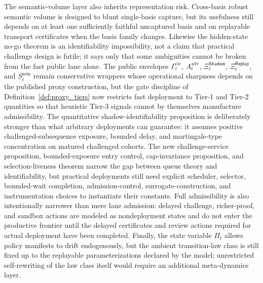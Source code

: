 \documentclass[11pt]{article}
\theoremstyle{definition}
\newcommand{\1}{\mathbf{1}}
\newcommand{\Shadow}{\mathsf{Shadow}}
\newcommand{\Replay}{\mathsf{Replay}}
\begin{document}
The semantic-volume layer also inherits representation risk. Cross-basis robust semantic volume is designed to blunt single-basis capture, but its usefulness still depends on at least one sufficiently faithful uncaptured basis and on replayable transport certificates when the basis family changes. Likewise the hidden-state no-go theorem is an identifiability impossibility, not a claim that practical challenge design is futile; it says only that some ambiguities cannot be broken from the fast public lane alone. The public envelopes $\Gamma_t^{\mathrm{cic}}$, $A_t^{\mathrm{adv}}$, $\Xi_t^{\Shadow}$, $\Xi_t^{\Replay}$, and $\underline S_t^{\mathrm{sem}}$ remain conservative wrappers whose operational sharpness depends on the published proxy construction, but the gate discipline of Definition~\ref{def:proxy_tiers} now restricts fast deployment to Tier-1 and Tier-2 quantities so that heuristic Tier-3 signals cannot by themselves manufacture admissibility. The quantitative shadow-identifiability proposition is deliberately stronger than what arbitrary deployments can guarantee: it assumes positive challenged-subsequence exposure, bounded delay, and martingale-type concentration on matured challenged cohorts. The new challenge-service proposition, bounded-exposure entry control, cap-invariance proposition, and selection-liveness theorem narrow the gap between queue theory and identifiability, but practical deployments still need explicit scheduler, selector, bounded-wait completion, admission-control, surrogate-construction, and instrumentation choices to instantiate their constants. Full admissibility is also intentionally narrower than mere lane admission: delayed challenge, richer-proof, and sandbox actions are modeled as nondeployment states and do not enter the productive frontier until the delayed certificates and review actions required for actual deployment have been completed. Finally, the state variable $\Pi_t$ allows policy manifests to drift endogenously, but the ambient transition-law class is still fixed up to the replayable parameterizations declared by the model; unrestricted self-rewriting of the law class itself would require an additional meta-dynamics layer.
\end{document}
